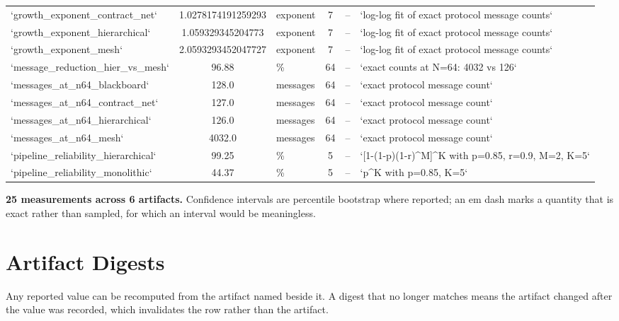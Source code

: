 \documentclass[11pt,a4paper]{article}
\begin{document}
\begin{table}[htbp]
{\begin{tabular}{lclcll}
`growth\_exponent\_contract\_net` & 1.0278174191259293 & exponent & 7 & -- & `log-log fit of exact protocol message counts` \\
`growth\_exponent\_hierarchical` & 1.059329345204773 & exponent & 7 & -- & `log-log fit of exact protocol message counts` \\
`growth\_exponent\_mesh` & 2.0593293452047727 & exponent & 7 & -- & `log-log fit of exact protocol message counts` \\
`message\_reduction\_hier\_vs\_mesh` & 96.88 & \% & 64 & -- & `exact counts at N=64: 4032 vs 126` \\
`messages\_at\_n64\_blackboard` & 128.0 & messages & 64 & -- & `exact protocol message count` \\
`messages\_at\_n64\_contract\_net` & 127.0 & messages & 64 & -- & `exact protocol message count` \\
`messages\_at\_n64\_hierarchical` & 126.0 & messages & 64 & -- & `exact protocol message count` \\
`messages\_at\_n64\_mesh` & 4032.0 & messages & 64 & -- & `exact protocol message count` \\
`pipeline\_reliability\_hierarchical` & 99.25 & \% & 5 & -- & `[1-(1-p)(1-r)^M]^K with p=0.85, r=0.9, M=2, K=5` \\
`pipeline\_reliability\_monolithic` & 44.37 & \% & 5 & -- & `p^K with p=0.85, K=5` \\
\bottomrule
\end{tabular}}
\end{table}

\textbf{25 measurements across 6 artifacts.} Confidence intervals are percentile bootstrap where reported; an em dash marks a quantity that is exact rather than sampled, for which an interval would be meaningless.


\section{Artifact Digests}
\begin{table}[htbp]
\centering
{}
\end{table}

Any reported value can be recomputed from the artifact named beside it. A digest that no longer matches means the artifact changed after the value was recorded, which invalidates the row rather than the artifact.




\par\vspace{0.5em}


\end{document}
